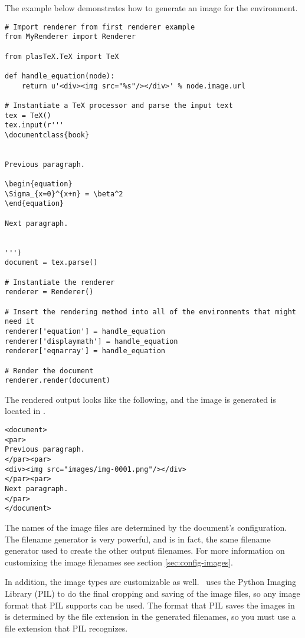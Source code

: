 The example below demonstrates how to generate an image for the 
 environment.
\begin{verbatim}
# Import renderer from first renderer example
from MyRenderer import Renderer

from plasTeX.TeX import TeX

def handle_equation(node):
    return u'<div><img src="%s"/></div>' % node.image.url

# Instantiate a TeX processor and parse the input text
tex = TeX()
tex.input(r'''
\documentclass{book}


Previous paragraph.

\begin{equation}
\Sigma_{x=0}^{x+n} = \beta^2
\end{equation}

Next paragraph.


''')
document = tex.parse()

# Instantiate the renderer
renderer = Renderer()

# Insert the rendering method into all of the environments that might need it
renderer['equation'] = handle_equation
renderer['displaymath'] = handle_equation
renderer['eqnarray'] = handle_equation

# Render the document
renderer.render(document)
\end{verbatim}

The rendered output looks like the following, and the image is generated
is located in .
\begin{verbatim}
<document>
<par>
Previous paragraph.
</par><par>
<div><img src="images/img-0001.png"/></div>
</par><par>
Next paragraph.
</par>
</document>
\end{verbatim}

The names of the image files are determined by the document's configuration.
The filename generator is very powerful, and is in fact, the same filename
generator used to create the other output filenames.  For more information
on customizing the image filenames see section \ref{sec:config-images}.

In addition, the image types are customizable as well.  \plasTeX\ uses
the Python Imaging Library (PIL) to do the final cropping and saving of the
image files, so any image format that PIL supports can be used.  The
format that PIL saves the images in is determined by the file extension
in the generated filenames, so you must use a file extension that 
PIL recognizes.


